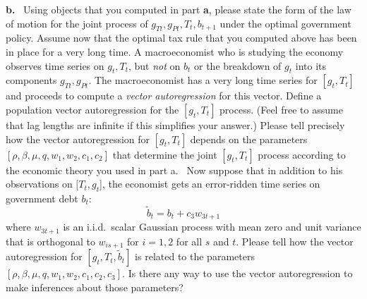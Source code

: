 \medskip \noindent
{\bf b.} \ Using objects that you computed in part {\bf a}, please state
the form of the law of motion for the joint process of $g_{Tt},
g_{Pt}, T_t, b_{t+1}$ under the optimal government policy.
\medskip
{}  Assume now that the optimal tax
rule that you computed above has been in place for a very long
time.  A macroeconomist who is studying the  economy observes time
series on $g_t, T_t$, but {\it not\/} on  $b_t$ or the breakdown
of $g_t$ into its components $g_{Tt}, g_{Pt}$. The macroeconomist
has a very long time series for $[g_t, T_t]$ and proceeds to
compute a {\it vector autoregression\/} for this vector.
\medskip
{}  Define a population vector autoregression for
the $[g_t, T_t]$ process. (Feel free to assume that lag lengths
are infinite if this simplifies your answer.)
\medskip
{}  Please tell precisely how the vector
autoregression for $[g_t, T_t]$ depends on the parameters $[\rho,
\beta, \mu, q, w_1, w_2, c_1, c_2]$ that determine the joint
$[g_t, T_t]$ process according to the economic theory you used in
part a.
\medskip
{} \  Now suppose that in addition to his
observations on $[T_t, g_t$], the economist gets an error-ridden
time series on government debt $b_t$:
$$ \tilde b_t = b_t + c_3 w_{3t+1} $$
where $w_{3t+1}$ is an i.i.d.\ scalar Gaussian process with mean
zero and unit variance that is orthogonal to $w_{is+1}$ for
$i=1,2$ for all $s$ and $t$. Please tell how the vector
autoregression for $[g_t, T_t, \tilde b_t]$ is related to the
parameters $[\rho, \beta, \mu, q, w_1, w_2, c_1, c_2, c_3]$. Is
there any way to  use the vector autoregression to make inferences
about those parameters?






